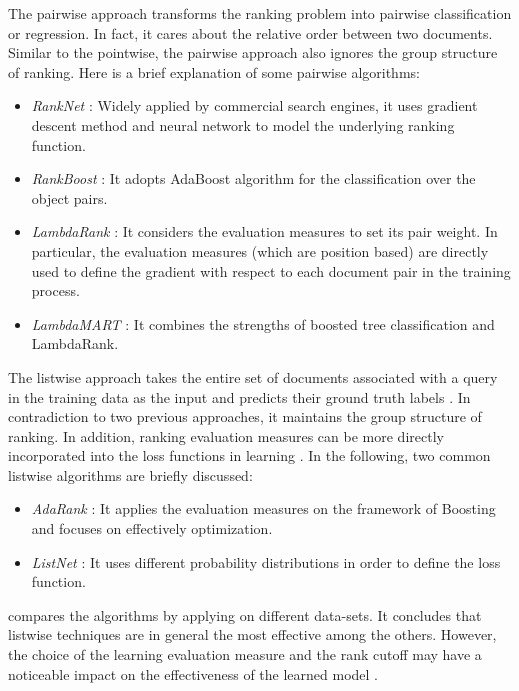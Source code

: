 The pairwise approach transforms the ranking problem into pairwise classification or regression. In fact, it cares about the relative order between two documents. Similar to the pointwise, the pairwise approach also ignores the group structure of ranking\citep{l2r-intro}. Here is a brief explanation of some pairwise algorithms:

\begin{itemize}
\item \textit{RankNet} \citep{l2r-ranknet}: Widely applied by commercial search engines, it uses gradient descent method and neural network to model the underlying ranking function.
\item \textit{RankBoost} \citep{l2r-rankboost}: It adopts AdaBoost algorithm for the classification over the object pairs.
\item \textit{LambdaRank} \citep{l2r-lambdarank}: It considers the evaluation measures to set its pair weight. In particular, the evaluation measures (which are position based) are directly used to define the gradient with respect to each document pair in the training process.
\item \textit{LambdaMART} \citep{l2r-lambdamart}: It combines the strengths of boosted tree classification and LambdaRank.
\end{itemize}

The listwise approach takes the entire set of documents associated with a query in the training data as the input and predicts their ground truth labels \citep{l2r-book}. In contradiction to two previous approaches, it maintains the group structure of ranking. In addition, ranking evaluation measures can be more directly incorporated into the loss functions in learning \citep{l2r-intro}. In the following, two common listwise algorithms are briefly discussed:

\begin{itemize}
\item \textit{AdaRank} \citep{l2r-adarank}: It applies the evaluation measures on the framework of Boosting and focuses on effectively optimization.
\item \textit{ListNet} \citep{l2r-listnet}: It uses different probability distributions in order to define the loss function.
\end{itemize}

\citet{l2r-book} compares the algorithms by applying on different data-sets. It concludes that listwise techniques are in general the most effective among the others. However, the choice of the learning evaluation measure and the rank cutoff may have a noticeable impact on the effectiveness of the learned model \citep{l2r-when}.

